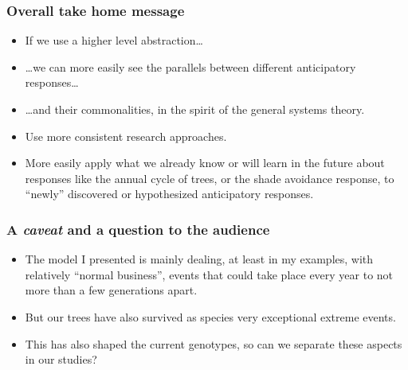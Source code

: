 \documentclass[10pt]{beamer}\usepackage[]{graphicx}\usepackage[]{color}
\begin{document}
\begin{frame}
  \frametitle{Overall take home message}
  \begin{itemize}
    \item If we use a higher level abstraction\ldots
    \item \ldots we can more easily see the parallels between different anticipatory responses\ldots
    \item \ldots and their commonalities, in the spirit of the general systems theory.
    \item Use more consistent research approaches.
    \item More easily apply what we already know or will learn in the future about responses like the annual cycle of trees, or the shade avoidance response, to ``newly'' discovered or hypothesized anticipatory responses.
  \end{itemize}
\end{frame}

\begin{frame}
  \frametitle{A \emph{caveat} and a question to the audience}
  \begin{itemize}
    \item The model I presented is mainly dealing, at least in my examples, with relatively ``normal business'', events that could take place every year to not more than a few generations apart.
    \item But our trees have also survived as species very exceptional extreme events.
    \item This has also shaped the current genotypes, so can we separate these aspects in our studies?
  \end{itemize}
\end{frame}


%
%
\end{document}
